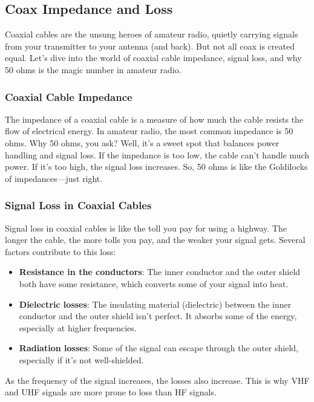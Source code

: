 \subsection{Coax Impedance and Loss}
\label{subsec:coax-imp}

Coaxial cables are the unsung heroes of amateur radio, quietly carrying signals from your transmitter to your antenna (and back). But not all coax is created equal. Let's dive into the world of coaxial cable impedance, signal loss, and why 50 ohms is the magic number in amateur radio.

\subsubsection*{Coaxial Cable Impedance}
The impedance of a coaxial cable is a measure of how much the cable resists the flow of electrical energy. In amateur radio, the most common impedance is 50 ohms. Why 50 ohms, you ask? Well, it's a sweet spot that balances power handling and signal loss. If the impedance is too low, the cable can't handle much power. If it's too high, the signal loss increases. So, 50 ohms is like the Goldilocks of impedances—just right.

\subsubsection*{Signal Loss in Coaxial Cables}
Signal loss in coaxial cables is like the toll you pay for using a highway. The longer the cable, the more tolls you pay, and the weaker your signal gets. Several factors contribute to this loss:
\begin{itemize}[noitemsep]    \item \textbf{Resistance in the conductors}: The inner conductor and the outer shield both have some resistance, which converts some of your signal into heat.
    \item \textbf{Dielectric losses}: The insulating material (dielectric) between the inner conductor and the outer shield isn't perfect. It absorbs some of the energy, especially at higher frequencies.
    \item \textbf{Radiation losses}: Some of the signal can escape through the outer shield, especially if it's not well-shielded.
\end{itemize}

As the frequency of the signal increases, the losses also increase. This is why VHF and UHF signals are more prone to loss than HF signals.

